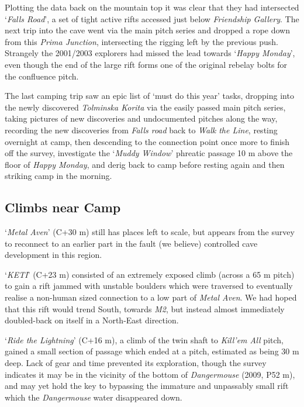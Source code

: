 Plotting the data back on the mountain top it was clear that they had
intersected `\emph{Falls Road}', a set of tight active rifts accessed
just below \emph{Friendship Gallery}. The next trip into the cave went
via the main pitch series and dropped a rope down from this \emph{Prima
Junction}, intersecting the rigging left by the previous push. Strangely
the 2001/2003 explorers had missed the lead towards `\emph{Happy
Monday}', even though the end of the large rift forms one of the
original rebelay bolts for the confluence pitch.

The last camping trip saw an epic list of `must do this year' tasks,
dropping into the newly discovered \emph{Tolminska Korita} via the
easily passed main pitch series, taking pictures of new discoveries and
undocumented pitches along the way, recording the new discoveries from
\emph{Falls road} back to \emph{Walk the Line}, resting overnight at
camp, then descending to the connection point once more to finish off
the survey, investigate the `\emph{Muddy Window}' phreatic passage 10 m
above the floor of \emph{Happy Monday}, and derig back to camp before
resting again and then striking camp in the morning.

\hypertarget{climbs-near-camp}{%
\subsection{Climbs near Camp}\label{climbs-near-camp}}

`\emph{Metal Aven}' (C+30 m) still has places left to scale, but appears
from the survey to reconnect to an earlier part in the fault (we
believe) controlled cave development in this region.

`\emph{KETI}' (C+23 m) consisted of an extremely exposed climb (across a
65 m pitch) to gain a rift jammed with unstable boulders which were
traversed to eventually realise a non-human sized connection to a low
part of \emph{Metal Aven}. We had hoped that this rift would trend
South, towards \emph{M2}, but instead almost immediately doubled-back on
itself in a North-East direction.

`\emph{Ride the Lightning}' (C+16 m), a climb of the twin shaft to
\emph{Kill'em All} pitch, gained a small section of passage which ended
at a pitch, estimated as being 30 m deep. Lack of gear and time
prevented its exploration, though the survey indicates it may be in the
vicinity of the bottom of \emph{Dangermouse} (2009, P52 m), and may yet
hold the key to bypassing the immature and unpassably small rift which
the \emph{Dangermouse} water disappeared down.

